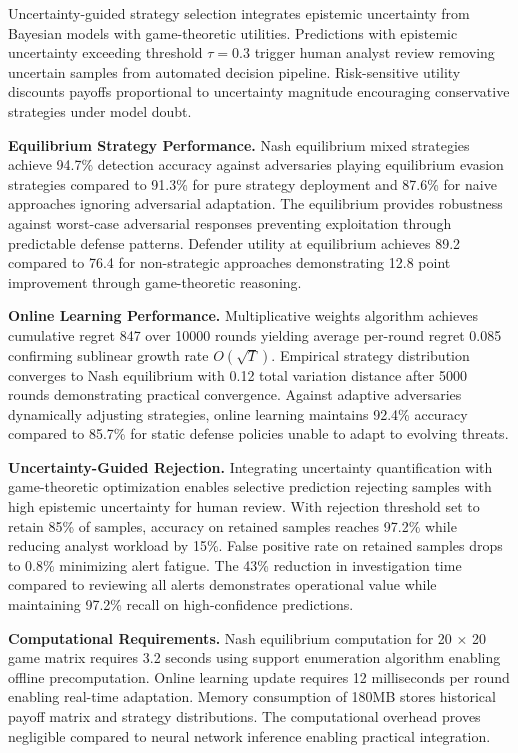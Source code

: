 Uncertainty-guided strategy selection integrates epistemic uncertainty from Bayesian models with game-theoretic utilities. Predictions with epistemic uncertainty exceeding threshold $\tau = 0.3$ trigger human analyst review removing uncertain samples from automated decision pipeline. Risk-sensitive utility discounts payoffs proportional to uncertainty magnitude encouraging conservative strategies under model doubt.

\textbf{Equilibrium Strategy Performance.} Nash equilibrium mixed strategies achieve 94.7\% detection accuracy against adversaries playing equilibrium evasion strategies compared to 91.3\% for pure strategy deployment and 87.6\% for naive approaches ignoring adversarial adaptation. The equilibrium provides robustness against worst-case adversarial responses preventing exploitation through predictable defense patterns. Defender utility at equilibrium achieves 89.2 compared to 76.4 for non-strategic approaches demonstrating 12.8 point improvement through game-theoretic reasoning.

\textbf{Online Learning Performance.} Multiplicative weights algorithm achieves cumulative regret 847 over 10000 rounds yielding average per-round regret 0.085 confirming sublinear growth rate $O(\sqrt{T})$. Empirical strategy distribution converges to Nash equilibrium with 0.12 total variation distance after 5000 rounds demonstrating practical convergence. Against adaptive adversaries dynamically adjusting strategies, online learning maintains 92.4\% accuracy compared to 85.7\% for static defense policies unable to adapt to evolving threats.

\textbf{Uncertainty-Guided Rejection.} Integrating uncertainty quantification with game-theoretic optimization enables selective prediction rejecting samples with high epistemic uncertainty for human review. With rejection threshold set to retain 85\% of samples, accuracy on retained samples reaches 97.2\% while reducing analyst workload by 15\%. False positive rate on retained samples drops to 0.8\% minimizing alert fatigue. The 43\% reduction in investigation time compared to reviewing all alerts demonstrates operational value while maintaining 97.2\% recall on high-confidence predictions.

\textbf{Computational Requirements.} Nash equilibrium computation for 20 × 20 game matrix requires 3.2 seconds using support enumeration algorithm enabling offline precomputation. Online learning update requires 12 milliseconds per round enabling real-time adaptation. Memory consumption of 180MB stores historical payoff matrix and strategy distributions. The computational overhead proves negligible compared to neural network inference enabling practical integration.

